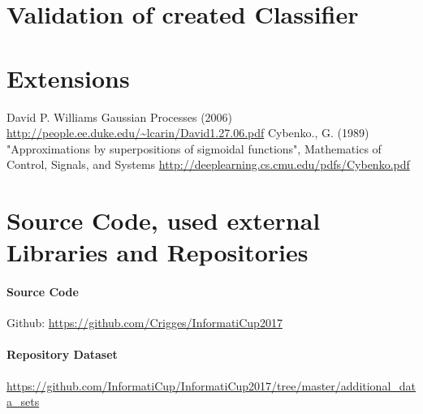 \documentclass[paper=A4,pagesize=auto,12pt,headinclude=true,footinclude=true,BCOR=0mm,DIV=calc]{scrartcl}
\begin{document}
	\section{Validation of created Classifier}
	
	\section{Extensions}
	
	
	
	\newpage
	
	\begin{thebibliography}{xxxxxx}
		 David P. Williams Gaussian Processes (2006) \url{http://people.ee.duke.edu/~lcarin/David1.27.06.pdf}
		  Cybenko., G. (1989) "Approximations by superpositions of sigmoidal functions", Mathematics of Control, Signals, and Systems \url{http://deeplearning.cs.cmu.edu/pdfs/Cybenko.pdf}
	\end{thebibliography}
	
	
	\section{Source Code, used external Libraries and Repositories}
	\paragraph{Source Code}
	Github: \url{https://github.com/Crigges/InformatiCup2017}\\
	\paragraph{Repository Dataset}
	\label{src:Repositories}
	\url{https://github.com/InformatiCup/InformatiCup2017/tree/master/additional_data_sets}
	
	
\end{document}
